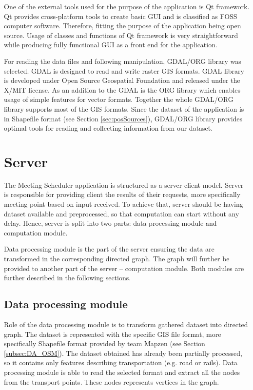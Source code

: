 \documentclass[thesis=M,english]{FITthesis}[2012/10/20]
\begin{document}
One of the external tools used for the purpose of the application is Qt framework. Qt provides cross-platform tools to create basic GUI and is classified as FOSS computer software. Therefore, fitting the purpose of the application being open source. 
Usage of classes and functions of Qt framework is very straightforward while producing fully functional GUI as a front end for the application. 

For reading the data files and following manipulation, GDAL/ORG library was selected. GDAL is designed to read and write raster GIS formats. GDAL library is developed under Open Source Geospatial Foundation and released under the X/MIT license. 
As an addition to the GDAL is the ORG library which enables usage of simple features for vector formats. Together the whole GDAL/ORG library supports most of the GIS formats. %
Since the dataset of the application is in Shapefile format (see Section \ref{sec:posSources}), GDAL/ORG library provides optimal tools for reading and collecting information from our dataset.

\section{Server}
\label{sec:server}
The Meeting Scheduler application is structured as a server-client model.
Server is responsible for providing client the results of their requests, more specifically meeting point based on input received. To achieve that, server should be having dataset available and preprocessed, so that computation can start without any delay. Hence, server is split into two parts: data processing module and computation module.

Data processing module is the part of the server ensuring the data are transformed in the corresponding directed graph. The graph will further be provided to another part of the server -- computation module. Both modules are further described in the following sections.


\subsection{Data processing module}
\label{subsec:dataprocessing} 
Role of the data processing module is to transform gathered dataset into directed graph. The dataset is represented with the specific GIS file format, more specifically Shapefile format provided by team Mapzen (see Section \ref{subsec:DA_OSM}). The dataset obtained has already been partially processed, so it contains only features describing transportation (e.g. road or rails). Data processing module is able to read the selected format and extract all the nodes from the transport points. These nodes represents vertices in the graph. 
\end{document}
